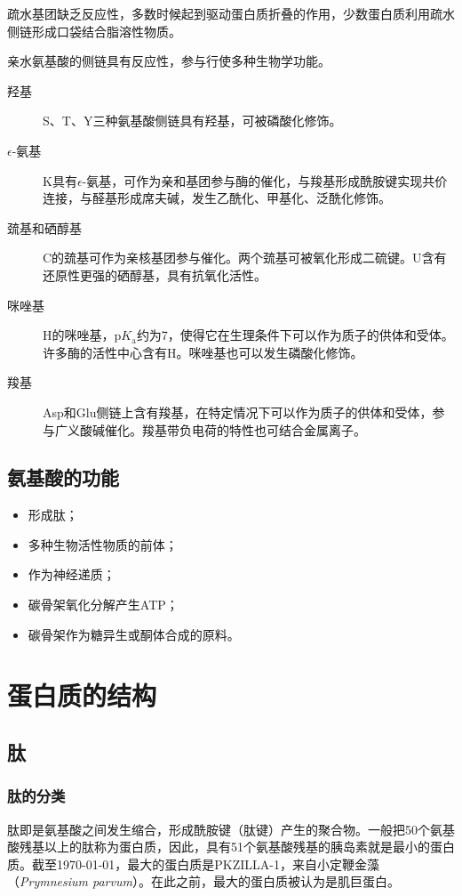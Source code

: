 疏水基团缺乏反应性，多数时候起到驱动蛋白质折叠的作用，少数蛋白质利用疏水侧链形成口袋结合脂溶性物质。

亲水氨基酸的侧链具有反应性，参与行使多种生物学功能。
\begin{description}
	\item[羟基] S、T、Y三种氨基酸侧链具有羟基，可被磷酸化修饰。
	\item[$\epsilon$-氨基] K具有$\epsilon$-氨基，可作为亲和基团参与酶的催化，与羧基形成酰胺键实现共价连接，与醛基形成席夫碱，发生乙酰化、甲基化、泛酰化修饰。
	\item[巯基和硒醇基] C的巯基可作为亲核基团参与催化。两个巯基可被氧化形成二硫键。U含有还原性更强的硒醇基，具有抗氧化活性。
	\item[咪唑基] H的咪唑基，$\mathrm{p}K_{\text{a}}$约为7，使得它在生理条件下可以作为质子的供体和受体。许多酶的活性中心含有H。咪唑基也可以发生磷酸化修饰。
	\item[羧基] Asp和Glu侧链上含有羧基，在特定情况下可以作为质子的供体和受体，参与广义酸碱催化。羧基带负电荷的特性也可结合金属离子。
\end{description}

\subsection{氨基酸的功能}

\begin{itemize}
	\item 形成肽；
	\item 多种生物活性物质的前体；
	\item 作为神经递质；
	\item 碳骨架氧化分解产生ATP；
	\item 碳骨架作为糖异生或酮体合成的原料。
\end{itemize}

\section{蛋白质的结构}

\subsection{肽}

\subsubsection{肽的分类}
肽即是氨基酸之间发生缩合，形成酰胺键（肽键）产生的聚合物。一般把50个氨基酸残基以上的肽称为蛋白质，因此，具有51个氨基酸残基的胰岛素就是最小的蛋白质。截至\today，最大的蛋白质是PKZILLA-1，来自小定鞭金藻（\textit{Prymnesium parvum}）。在此之前，最大的蛋白质被认为是肌巨蛋白。

